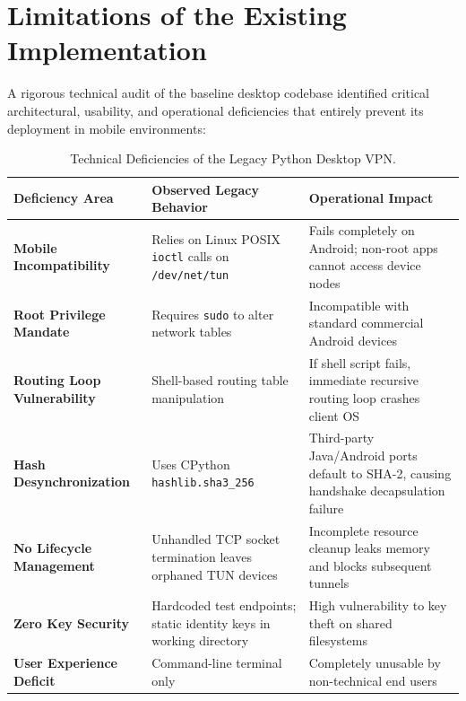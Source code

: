 \section{Limitations of the Existing Implementation}
\label{sec:existing_system_limitations}

A rigorous technical audit of the baseline desktop codebase identified critical architectural, usability, and operational deficiencies that entirely prevent its deployment in mobile environments:

\begin{table}[htbp]
  \centering
  \small
  \caption{Technical Deficiencies of the Legacy Python Desktop VPN.}
  \label{tab:legacy_system_deficiencies}
  \begin{tabular}{@{}P{3.2cm}P{5.0cm}P{6.0cm}@{}}
    \toprule
    \textbf{Deficiency Area} & \textbf{Observed Legacy Behavior} & \textbf{Operational Impact} \\
    \midrule
    \textbf{Mobile Incompatibility} & Relies on Linux POSIX \texttt{ioctl} calls on \texttt{/dev/net/tun} & Fails completely on Android; non-root apps cannot access device nodes \\
    \addlinespace
    \textbf{Root Privilege Mandate} & Requires \texttt{sudo} to alter network tables & Incompatible with standard commercial Android devices \\
    \addlinespace
    \textbf{Routing Loop Vulnerability} & Shell-based routing table manipulation & If shell script fails, immediate recursive routing loop crashes client OS \\
    \addlinespace
    \textbf{Hash Desynchronization} & Uses CPython \texttt{hashlib.sha3\_256} & Third-party Java/Android ports default to SHA-2, causing handshake decapsulation failure \\
    \addlinespace
    \textbf{No Lifecycle Management} & Unhandled TCP socket termination leaves orphaned TUN devices & Incomplete resource cleanup leaks memory and blocks subsequent tunnels \\
    \addlinespace
    \textbf{Zero Key Security} & Hardcoded test endpoints; static identity keys in working directory & High vulnerability to key theft on shared filesystems \\
    \addlinespace
    \textbf{User Experience Deficit} & Command-line terminal only & Completely unusable by non-technical end users \\
    \bottomrule
  \end{tabular}
\end{table}

